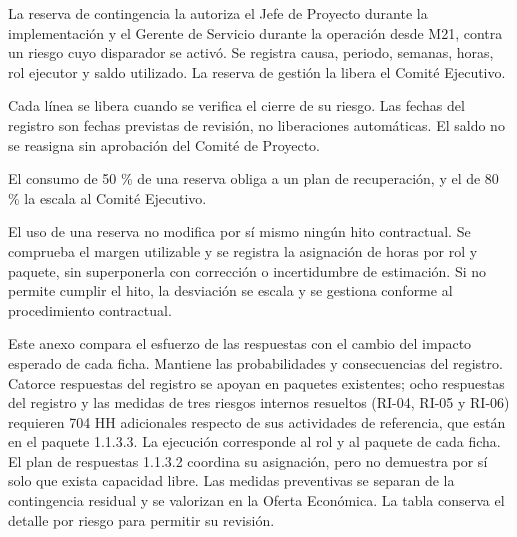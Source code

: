 \documentclass[anexo]{../../comun/overfore}
\begin{document}
La reserva de contingencia la autoriza el Jefe de Proyecto durante la implementación y el Gerente de Servicio durante la operación desde M21, contra un riesgo cuyo disparador se activó. Se registra causa, periodo, semanas, horas, rol ejecutor y saldo utilizado. La reserva de gestión la libera el Comité Ejecutivo.

Cada línea se libera cuando se verifica el cierre de su riesgo. Las fechas del registro son fechas previstas de revisión, no liberaciones automáticas. El saldo no se reasigna sin aprobación del Comité de Proyecto.

El consumo de 50 \% de una reserva obliga a un plan de recuperación, y el de 80 \% la escala al Comité Ejecutivo.

El uso de una reserva no modifica por sí mismo ningún hito contractual. Se comprueba el margen utilizable y se registra la asignación de horas por rol y paquete, sin superponerla con corrección o incertidumbre de estimación. Si no permite cumplir el hito, la desviación se escala y se gestiona conforme al procedimiento contractual.

Este anexo compara el esfuerzo de las respuestas con el cambio del impacto esperado de cada ficha. Mantiene las probabilidades y consecuencias del registro. Catorce respuestas del registro se apoyan en paquetes existentes; ocho respuestas del registro y las medidas de tres riesgos internos resueltos (RI-04, RI-05 y RI-06) requieren 704 HH adicionales respecto de sus actividades de referencia, que están en el paquete 1.1.3.3. La ejecución corresponde al rol y al paquete de cada ficha. El plan de respuestas 1.1.3.2 coordina su asignación, pero no demuestra por sí solo que exista capacidad libre. Las medidas preventivas se separan de la contingencia residual y se valorizan en la Oferta Económica. La tabla conserva el detalle por riesgo para permitir su revisión.
\end{document}
